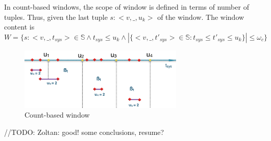 In count-based windows, the scope of window is defined in terms of number of tuples. Thus, given the last tuple $s:<v, \_, u_k>$ of the window. The window content is 
$W=\{s:<v, \_, t_{sys}> \in \mathbb{S} \wedge t_{sys} \leq u_k \wedge  |\{<v,\_,t'_{sys}> \in \mathbb{S} : t_{sys} \leq t'_{sys} \leq u_k\}| \leq \omega_c \}$

\begin{figure}[htbp!] 
\centering    
\includegraphics[width=0.7\textwidth]{countbased_window}
\caption{Count-based window}
\label{fig:countbased_window}
\end{figure}

//TODO: Zoltan: good! some conclusions, resume?

